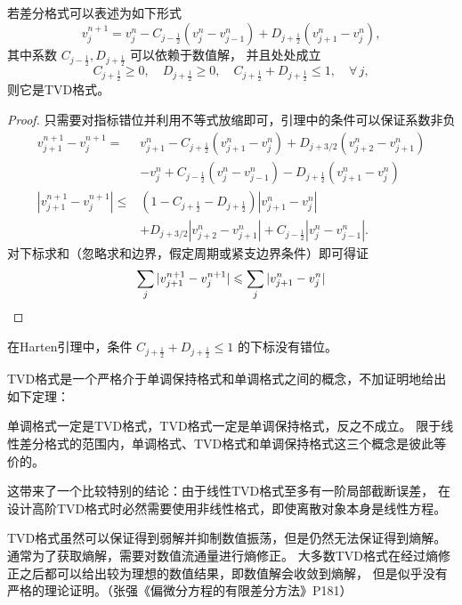 \begin{lemma}[Harten引理]
    若差分格式可以表述为如下形式
    \[
        v_j^{n+1} = v_j^n - C_{j-\frac12}(v_j^n - v_{j-1}^n) + D_{j+\frac12}(v_{j+1}^n - v_j^n),
    \]
    其中系数 $C_{j-\frac12}, D_{j+\frac12}$ 可以依赖于数值解，
    并且处处成立
    \[
        C_{j+\frac12} \ge 0,\quad D_{j+\frac12} \ge 0,\quad C_{j+\frac12} + D_{j+\frac12} \le 1,\quad \forall\, j,
    \]
    则它是TVD格式。
\end{lemma}
\begin{proof}
    只需要对指标错位并利用不等式放缩即可，引理中的条件可以保证系数非负
    \begin{align*}
        v_{j+1}^{n+1} - v_j^{n+1} ={}     &
        v_{j+1}^n - C_{j+\frac12}(v_{j+1}^n - v_{j}^n) + D_{j+3/2}(v_{j+2}^n - v_{j+1}^n)
        \\
                                          & -  v_j^n + C_{j-\frac12}(v_j^n - v_{j-1}^n) - D_{j+\frac12}(v_{j+1}^n - v_j^n)
        \\
        |v_{j+1}^{n+1} - v_j^{n+1}| \le{} &
        (1-C_{j+\frac12} - D_{j+\frac12})|v_{j+1}^n - v_j^n|                                                               \\
                                          & + D_{j+3/2}|v_{j+2}^n - v_{j+1}^n|
        + C_{j-\frac12}|v_j^n - v_{j-1}^n|.
    \end{align*}
    对下标求和（忽略求和边界，假定周期或紧支边界条件）即可得证
    \[
        \sum_j |v_{j+1}^{n+1} - v_j^{n+1}| \le \sum_j |v_{j+1}^{n} - v_j^{n}| \qedhere
    \]
\end{proof}

\begin{remark}
    在Harten引理中，条件 $C_{j+\frac12} + D_{j+\frac12} \le 1$ 的下标没有错位。
\end{remark}

TVD格式是一个严格介于单调保持格式和单调格式之间的概念，不加证明地给出如下定理：
\begin{theorem}
    单调格式一定是TVD格式，TVD格式一定是单调保持格式，反之不成立。
    限于线性差分格式的范围内，单调格式、TVD格式和单调保持格式这三个概念是彼此等价的。
\end{theorem}

这带来了一个比较特别的结论：由于线性TVD格式至多有一阶局部截断误差，
在设计高阶TVD格式时必然需要使用非线性格式，即使离散对象本身是线性方程。

TVD格式虽然可以保证得到弱解并抑制数值振荡，但是仍然无法保证得到熵解。
通常为了获取熵解，需要对数值流通量进行熵修正。
大多数TVD格式在经过熵修正之后都可以给出较为理想的数值结果，即数值解会收敛到熵解，
但是似乎没有严格的理论证明。（张强《偏微分方程的有限差分方法》P181）


